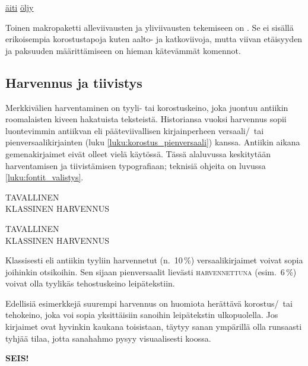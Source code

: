 \begin{tulossis}
  \setlength{\ULdepth}{.2ex}
  \renewcommand{\ULthickness}{.1ex}
  \uline{äiti} \uline{öljy}
\end{tulossis}

Toinen makropaketti alleviivausten ja yliviivausten tekemiseen on
. Se ei sisällä erikoisempia korostustapoja
kuten aalto- ja katkoviivoja, mutta viivan etäisyyden ja paksuuden
määrittämiseen on hieman kätevämmät komennot.

\subsection{Harvennus ja tiivistys}
\label{luku:korostus_harvennus}

Merkkivälien harventaminen on tyyli- tai korostuskeino, joka juontuu
antiikin roomalaisten kiveen hakatuista teksteistä. Historiansa vuoksi
harvennus sopii luontevimmin antiikvan eli pääteviivallisen
kirjainperheen versaali\-/\ tai pienversaalikirjainten (luku
\ref{luku:korostus_pienversaali}) kanssa. Antiikin aikana
gemenakirjaimet eivät olleet vielä käytössä. Tässä alaluvussa
keskitytään harventamisen ja tiivistämisen typografiaan; teknisiä
ohjeita on luvussa \ref{luku:fontit_valistys}.

\begin{koodilohkosis}
\large TAVALLINEN \\
{ KLASSINEN HARVENNUS}
\end{koodilohkosis}

\begin{tulossis}
  \large
  TAVALLINEN \\
  { KLASSINEN HARVENNUS}
\end{tulossis}

Klassisesti eli antiikin tyyliin harvennetut (n.~10\,\%)
versaalikirjaimet voivat sopia joihinkin otsikoihin. Sen sijaan
pienversaalit lievästi {
  \textsc{harvennettuna}} (esim.~6\,\%) voivat olla tyylikäs
tehostuskeino leipätekstiin.

Edellisiä esimerkkejä suurempi harvennus on huomiota herättävä
korostus\-/\ tai tehokeino, joka voi sopia yksittäisiin sanoihin
leipätekstin ulkopuolella. Jos kirjaimet ovat hyvinkin kaukana
toisistaan, täytyy sanan ympärillä olla runsaasti tyhjää tilaa, jotta
sanahahmo pysyy visuaalisesti koossa.

\begin{koodilohkosis}
{\sffamily\bfseries{} SEIS!}
\end{koodilohkosis}

